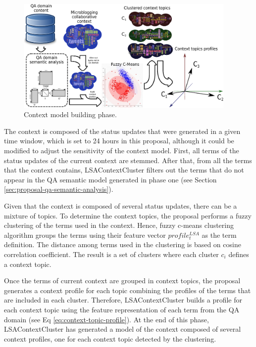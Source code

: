 \documentclass[preprint]{elsarticle}
\begin{document}
\begin{spacing}{1.5}
\begin{figure}[h]
	\centering
	\includegraphics[width=0.95\textwidth]{figures/clustering-phase.eps}
	\caption{Context model building phase.}
	\label{fig:proposal-context-clustering-phase}
\end{figure}

The context is composed of the status updates that were generated in a given time window, which is set to 24 hours in this proposal, although it could be modified to adjust the sensitivity of the context model. First, all terms of the status updates of the current context are stemmed. After that, from all the terms that the context contains, LSAContextCluster filters out the terms that do not appear in the QA semantic model generated in phase one (see Section \ref{sec:proposal-qa-semantic-analysis}).

Given that the context is composed of several status updates, there can be a mixture of topics. To determine the context topics, the proposal performs a fuzzy clustering of the terms used in the context. Hence, fuzzy c-means clustering algorithm \cite{Bezdek1984} groups the terms using their feature vector $profile^{LSA}_t$ as the term definition. The distance among terms used in the clustering is based on cosine correlation coefficient. The result is a set of clusters where each cluster  $c_i$ defines a context topic.

Once the terms of current context are grouped in context topics, the proposal generates a context profile for each topic combining the profiles of the terms that are included in each cluster. Therefore, LSAContextCluster builds a profile for each context topic using the feature representation of each term from the QA domain (see Eq \ref{eq:context-topic-profile}). At the end of this phase, LSAContextCluster has generated a model of the context composed of several context profiles, one for each context topic detected by the clustering.


\end{spacing}
\end{document}
